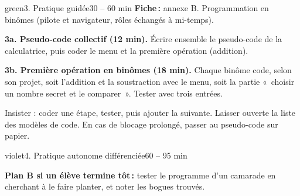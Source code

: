 \documentclass[11pt,a4paper]{article}
\begin{document}
\begin{etape}{green}{3. Pratique guidée}{30 -- 60 min}
\textbf{Fiche\,:} annexe B. Programmation en binômes (pilote et navigateur, rôles échangés à mi-temps).

\textbf{3a. Pseudo-code collectif (12 min).} Écrire ensemble le pseudo-code de la calculatrice, puis coder le menu et la première opération (addition).

\textbf{3b. Première opération en binômes (18 min).} Chaque binôme code, selon son projet, soit l'addition et la soustraction avec le menu, soit la partie «~choisir un nombre secret et le comparer~». Tester avec trois entrées.


\begin{astuce}
Insister : coder une étape, tester, puis ajouter la suivante. Laisser ouverte la liste des modèles de code. En cas de blocage prolongé, passer au pseudo-code sur papier.
\end{astuce}
\end{etape}

\begin{etape}{violet}{4. Pratique autonome différenciée}{60 -- 95 min}

\medskip
\textbf{Plan B si un élève termine tôt\,:} tester le programme d'un camarade en cherchant à le faire planter, et noter les bogues trouvés.
\end{etape}
\end{document}
